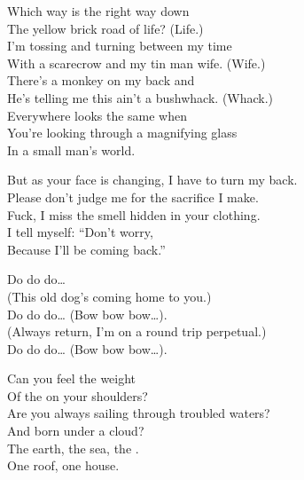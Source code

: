 
Which way is the right way down \\
The yellow brick road of life? (Life.) \\
I'm tossing and turning between my time \\
With a scarecrow and my tin man wife. (Wife.) \\
There's a monkey on my back and \\
He's telling me this ain't a bushwhack. (Whack.) \\
Everywhere looks the same when \\
You're looking through a magnifying glass \\
In a small man's world. \\


But as your face is changing, I have to turn my back. \\
Please don't judge me for the sacrifice I make. \\
Fuck, I miss the smell hidden in your clothing. \\
I tell myself: ``Don't worry, \\
Because I'll be coming back.'' \\


Do do do… \\
(This old dog's coming home to you.) \\
Do do do… (Bow bow bow…). \\
(Always return, I'm on a round trip perpetual.) \\
Do do do… (Bow bow bow…). \\





Can you feel the weight \\
Of the  on your shoulders? \\
Are you always sailing through troubled waters? \\
And born under a cloud? \\
The earth, the sea, the . \\
One roof, one house. \\

